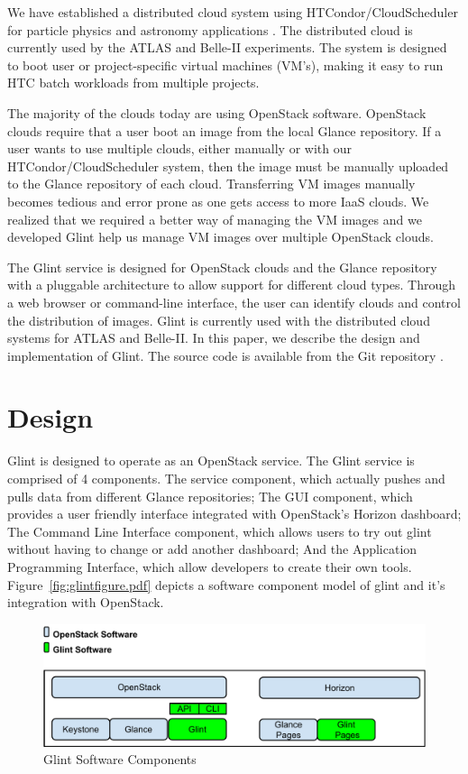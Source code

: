 \documentclass[a4paper]{jpconf}
\begin{document}
We have established a distributed cloud system using HTCondor/CloudScheduler for particle physics and astronomy applications \cite{hpcs:cloudpaper, sobie-nyc-cloud}. The distributed cloud is currently used by the ATLAS \cite{ryan-chep} and Belle-II \cite{sobie-chep} experiments. The system is designed to boot user or project-specific virtual machines (VM's), making it easy to run HTC batch workloads from multiple projects.

The majority of the clouds today are using OpenStack software. OpenStack clouds require that a user boot an image from the local Glance repository. If a user wants to use multiple clouds, either manually or with our HTCondor/CloudScheduler system, then the image must be manually uploaded to the Glance repository of each cloud. Transferring VM images manually becomes tedious and error prone as one gets access to more IaaS clouds. We realized that we required a better way of managing the VM images and we developed Glint help us manage VM images over multiple OpenStack clouds.

The Glint service is designed for OpenStack clouds and the Glance repository with a pluggable architecture to allow support for different cloud types. Through a web browser or command-line interface, the user can identify clouds and control the distribution of images. Glint is currently used with the distributed cloud systems for ATLAS and Belle-II. In this paper, we describe the design and implementation of Glint. The source code is available from the Git repository \cite{glint}.

\section{Design}
Glint is designed to operate as an OpenStack service. The Glint service is comprised of 4 components. The service component, which actually pushes and pulls data from different Glance repositories; The GUI component, which provides a user friendly interface integrated with OpenStack's Horizon dashboard; The Command Line Interface component, which allows users to try out glint without having to change or add another dashboard; And the Application Programming Interface, which allow developers to create their own tools. Figure~\ref{fig:glintfigure.pdf} depicts a software component model of glint and it's integration with OpenStack. 

\begin{figure}[ht]
\begin{center}
\includegraphics[width=36pc]{images/glintdesign.pdf}
\caption{\label{fig:glintfigure}Glint Software Components}
\end{center}
\end{figure}
\end{document}
